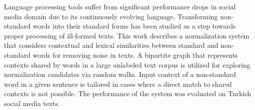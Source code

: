Language processing tools suffer from significant performance drops in social media domain due to its continuously evolving language. Transforming non-standard words into their standard forms has been studied as a step towards proper processing of ill-formed texts. This work describes a normalization system that considers contextual and lexical similarities between standard and non-standard words for removing noise in texts. A bipartite graph that represents contexts shared by words in a large unlabeled text corpus is utilized for exploring normalization candidates via random walks. Input context of a non-standard word in a given sentence is tailored in cases where a direct match to shared contexts is not possible. The performance of the system was evaluated on Turkish social media texts.
